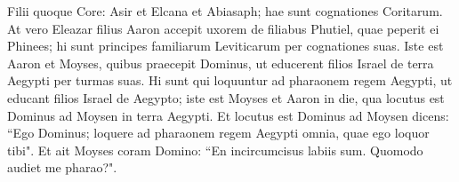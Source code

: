 \begin{biblechapter}
\verse Filii quoque Core: Asir et Elcana et Abiasaph; hae sunt cognationes Coritarum. 
\verse At vero Eleazar filius Aaron accepit uxorem de filiabus Phutiel, quae peperit ei Phinees; hi sunt principes familiarum Leviticarum per cognationes suas. 
\verse Iste est Aaron et Moyses, quibus praecepit Dominus, ut educerent filios Israel de terra Aegypti per turmas suas. 
\verse Hi sunt qui loquuntur ad pharaonem regem Aegypti, ut educant filios Israel de Aegypto; iste est Moyses et Aaron 
\verse in die, qua locutus est Dominus ad Moysen in terra Aegypti. 
\verse Et locutus est Dominus ad Moysen dicens: “Ego Dominus; loquere ad pharaonem regem Aegypti omnia, quae ego loquor tibi". 
\verse Et ait Moyses coram Domino: “En incircumcisus labiis sum. Quomodo audiet me pharao?". 
\end{biblechapter}

